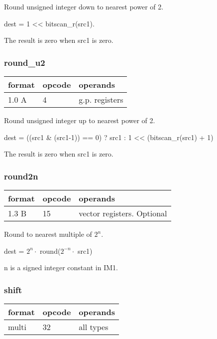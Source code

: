 \documentclass[forwardcom.tex]{subfiles}
\begin{document}
Round unsigned integer down to nearest power of 2.

dest = 1 \textless\textless{} bitscan\_r(src1).
\vspace{2mm}

The result is zero when src1 is zero.

\subsubsection{round\_u2}
\label{table:roundU2Instruction}
\begin{tabular}{|p{12mm}|p{12mm}|p{110mm}|}
\hline
\bfseries format & \bfseries opcode & \bfseries operands \\ \hline
1.0 A &  4 & g.p. registers \\ \hline
\end{tabular}
\vspace{2mm}

Round unsigned integer up to nearest power of 2.

dest = ((src1 \& (src1-1)) == 0) ? src1 : 1 \textless\textless{}  (bitscan\_r(src1) + 1)
\vspace{2mm}

The result is zero when src1 is zero.

\subsubsection{round2n}
\label{table:round2nInstruction}
\begin{tabular}{|p{12mm}|p{12mm}|p{110mm}|}
\hline
\bfseries format & \bfseries opcode & \bfseries operands \\ \hline
1.3 B & 15 & vector registers. Optional \\ \hline
\end{tabular}
\vspace{2mm}

Round to nearest multiple of $2^n$.

dest = $2^n\cdot$ round($2^{-n}\cdot$ src1)

n is a signed
integer constant in IM1.

\subsubsection{shift}
\label{table:shiftInstruction}
\begin{tabular}{|p{12mm}|p{12mm}|p{110mm}|}
\hline
\bfseries format & \bfseries opcode & \bfseries operands \\ \hline
multi & 32 & all types \\ \hline
\end{tabular}
\vspace{2mm}
\end{document}
